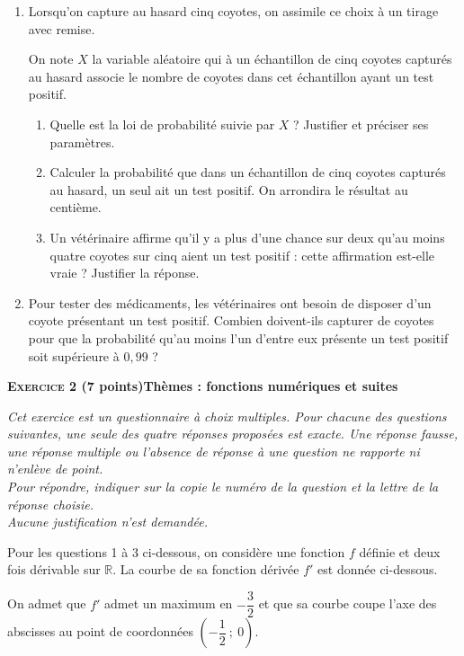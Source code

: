 \documentclass[11pt,a4paper,french]{article}
\newcommand{\R}{\mathbb{R}}
\begin{document}
\begin{enumerate}
\item Lorsqu'on capture au hasard cinq coyotes, on assimile ce choix à un tirage avec remise.

On note $X$ la variable aléatoire qui à un échantillon de cinq coyotes capturés au hasard associe le nombre de coyotes dans cet échantillon ayant un test positif.
\begin{enumerate}
\item Quelle est la loi de probabilité suivie par $X$ ? Justifier et préciser ses paramètres.
\item Calculer la probabilité que dans un échantillon de cinq coyotes capturés au hasard, un seul ait un test positif. On arrondira le résultat au centième.
\item Un vétérinaire affirme qu'il y a plus d'une chance sur deux qu'au moins quatre coyotes sur cinq aient un test positif : cette affirmation est-elle vraie ? Justifier la réponse.
	\end{enumerate}	
\item Pour tester des médicaments, les vétérinaires ont besoin de disposer d'un coyote présentant un test positif. Combien doivent-ils capturer de coyotes pour que la probabilité qu'au moins l'un d'entre eux présente un test positif soit supérieure à $0,99$ ?
\end{enumerate}

\bigskip

\textbf{\textsc{Exercice 2} \quad (7 points)\hfill Thèmes : fonctions numériques et suites}

\medskip

\emph{Cet exercice est un questionnaire à choix multiples. Pour chacune des questions suivantes, une seule des quatre réponses proposées est exacte. Une réponse fausse, une réponse multiple ou l'absence de réponse à une question ne rapporte ni n'enlève de point.\\
Pour répondre, indiquer sur la copie le numéro de la question et la lettre de la réponse choisie.\\Aucune justification n'est demandée.}

\medskip

Pour les questions 1 à 3 ci-dessous, on considère une fonction $f$ définie et deux fois dérivable sur $\R$. La courbe de sa fonction dérivée $f'$ est donnée ci-dessous.

On admet que $f'$ admet un maximum en $- \dfrac{3}{2}$ et que sa courbe coupe l'axe des abscisses au point de coordonnées $\left(- \dfrac12~;~0\right)$.
\end{document}
